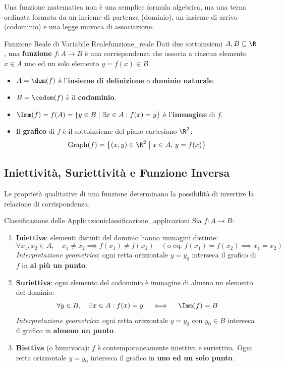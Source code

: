 Una funzione matematica non è una semplice formula algebrica, ma una terna ordinata formata da un insieme di partenza (dominio), un insieme di arrivo (codominio) e una legge univoca di associazione.

\begin{definizione}{Funzione Reale di Variabile Reale}{funzione_reale}
Dati due sottoinsiemi $A, B \subseteq \R$, una \textbf{funzione} $f \colon A \to B$ è una corrispondenza che associa a ciascun elemento $x \in A$ uno ed un solo elemento $y = f(x) \in B$.
\begin{itemize}
    \item $A = \dom(f)$ è l'\textbf{insieme di definizione} o \textbf{dominio naturale}.
    \item $B = \codom(f)$ è il \textbf{codominio}.
    \item $\Imm(f) = f(A) = \{y \in B \mid \exists x \in A : f(x) = y\}$ è l'\textbf{immagine} di $f$.
    \item Il \textbf{grafico} di $f$ è il sottoinsieme del piano cartesiano $\R^2$:
    \[
        \operatorname{Graph}(f) = \big\{ (x, y) \in \R^2 \;\big|\; x \in A, \, y = f(x) \big\}
    \]
\end{itemize}
\end{definizione}

\subsection{Iniettività, Suriettività e Funzione Inversa}
Le proprietà qualitative di una funzione determinano la possibilità di invertire la relazione di corrispondenza.

\begin{definizione}{Classificazione delle Applicazioni}{classificazione_applicazioni}
Sia $f \colon A \to B$:
\begin{enumerate}
    \item \textbf{Iniettiva}: elementi distinti del dominio hanno immagini distinte:
    \[
        \forall x_1, x_2 \in A, \quad x_1 \neq x_2 \implies f(x_1) \neq f(x_2) \quad \left(\text{o eq. } f(x_1) = f(x_2) \implies x_1 = x_2\right)
    \]
    \emph{Interpretazione geometrica}: ogni retta orizzontale $y = y_0$ interseca il grafico di $f$ in \textbf{al più un punto}.
    \item \textbf{Suriettiva}: ogni elemento del codominio è immagine di almeno un elemento del dominio:
    \[
        \forall y \in B, \quad \exists x \in A : f(x) = y \quad \iff \quad \Imm(f) = B
    \]
    \emph{Interpretazione geometrica}: ogni retta orizzontale $y = y_0$ con $y_0 \in B$ interseca il grafico in \textbf{almeno un punto}.
    \item \textbf{Biettiva} (o biunivoca): $f$ è contemporaneamente iniettiva e suriettiva. Ogni retta orizzontale $y = y_0$ interseca il grafico in \textbf{uno ed un solo punto}.
\end{enumerate}
\end{definizione}

